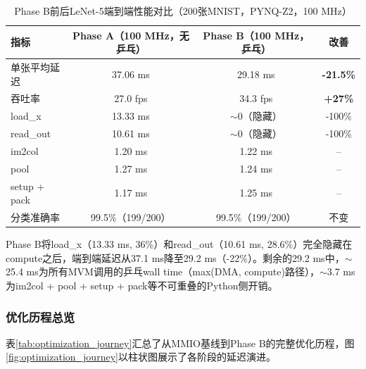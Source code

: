 \documentclass[12pt, a4paper]{article}
\begin{document}
\begin{table}[H]
    \centering
    \caption{Phase B前后LeNet-5端到端性能对比（200张MNIST，PYNQ-Z2，100 MHz）}
    \label{tab:phase_b_benchmark}
    \begin{tabular}{lccc}
        \toprule
        指标 & Phase A（100 MHz，无乒乓） & Phase B（100 MHz，乒乓） & 改善 \\
        \midrule
        单张平均延迟 & 37.06 ms & 29.18 ms & \textbf{-21.5\%} \\
        吞吐率 & 27.0 fps & 34.3 fps & \textbf{+27\%} \\
        load\_x & 13.33 ms & $\sim$0（隐藏） & -100\% \\
        read\_out & 10.61 ms & $\sim$0（隐藏） & -100\% \\
        im2col & 1.20 ms & 1.22 ms & -- \\
        pool & 1.27 ms & 1.24 ms & -- \\
        setup + pack & 1.17 ms & 1.25 ms & -- \\
        分类准确率 & 99.5\%（199/200） & 99.5\%（199/200） & 不变 \\
        \bottomrule
    \end{tabular}
\end{table}

Phase B将load\_x（13.33 ms, 36\%）和read\_out（10.61 ms, 28.6\%）完全隐藏在compute之后，端到端延迟从37.1 ms降至29.2 ms（-22\%）。剩余的29.2 ms中，$\sim$25.4 ms为所有MVM调用的乒乓wall time（max(DMA, compute)路径），$\sim$3.7 ms为im2col + pool + setup + pack等不可重叠的Python侧开销。

\subsubsection{优化历程总览}

表\ref{tab:optimization_journey}汇总了从MMIO基线到Phase B的完整优化历程，图\ref{fig:optimization_journey}以柱状图展示了各阶段的延迟演进。
\end{document}
